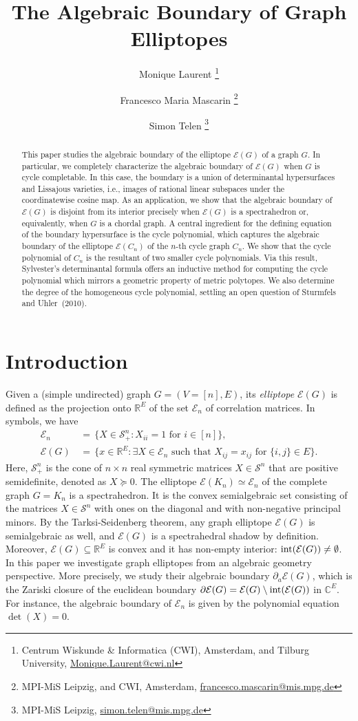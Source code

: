 \documentclass[a4paper, 11pt, twoside]{article}
\title{\bf The Algebraic Boundary of Graph Elliptopes}
\author{Monique Laurent \thanks{Centrum Wiskunde \& Informatica (CWI), Amsterdam, and Tilburg University, \url{Monique.Laurent@cwi.nl}}
\and Francesco Maria Mascarin \thanks{MPI-MiS Leipzig, and CWI, Amsterdam,
\url{francesco.mascarin@mis.mpg.de}}
\and  Simon Telen \thanks{MPI-MiS Leipzig,
\url{simon.telen@mis.mpg.de}}
}
\date{}
\newcommand{\R}{\mathbb{R}}
\newcommand{\ME}{{\mathcal E}}
\newcommand{\MS}{{\mathcal S}}
\theoremstyle{plain}
\begin{document}
 \maketitle

\begin{abstract}
\noindent This paper studies the algebraic boundary of the elliptope $\ME(G)$ of a graph $G$. In particular, we completely characterize the algebraic boundary of $\ME(G)$ when $G$ is cycle completable. In this case, the boundary is a union of determinantal hypersurfaces and Lissajous varieties, i.e., images of rational linear subspaces under the coordinatewise cosine map. 
As an application, we show that the algebraic boundary of  $\ME(G)$ is disjoint from its interior precisely when $\ME(G)$ is a spectrahedron or, equivalently, when $G$ is a chordal graph.
A central ingredient for the defining equation of the boundary hypersurface is the cycle polynomial, which captures the algebraic boundary of the elliptope $\ME(C_n)$ of the 
 $n$-th cycle graph $C_n$. We show that the cycle polynomial of $C_n$ is the resultant of two smaller cycle polynomials. Via this result, Sylvester's determinantal formula offers an inductive method for computing the cycle polynomial which mirrors a geometric property of metric polytopes.
 We also determine the degree of the homogeneous cycle polynomial, settling an open question of Sturmfels and Uhler~(2010). 
\end{abstract}

\section{Introduction}\label{sec:introduction}

Given a (simple undirected) graph $G=(V=[n],E)$, its  {\em elliptope} $\ME(G)$ is defined as the projection onto $\R^E$ of the set $\ME_n$ of correlation matrices. In symbols, we have
\begin{align*}
\ME_n & \, = \, \{X\in \MS^n_+:     X_{ii}=1 \text{ for } i\in [n]\},\\
 \ME(G) & \,  = \,  \{x\in \R^E: \exists X \in \ME_n \text{ such that } X_{ij}=x_{ij} \text{ for } \{i,j\}\in E\}.
\end{align*}
Here, $\MS^n_+$ is the cone of $n\times n$ real symmetric matrices $X\in\MS^n$ that are  positive semidefinite, denoted as $X\succeq 0$. The elliptope $\ME(K_n)\simeq \ME_n$ of the  complete graph $G=K_n$ is a spectrahedron. It is the convex semialgebraic set consisting of the matrices $X \in \MS^n$ with ones on the diagonal and with non-negative principal minors. By the Tarksi-Seidenberg theorem, any graph elliptope $\ME(G)$ is semialgebraic as well, and $\ME(G)$ is a spectrahedral shadow by definition. Moreover, $\ME(G) \subseteq \R^E$ is convex and it has non-empty interior: ${\rm int}(\ME(G)) \neq \emptyset$. In this paper we investigate graph elliptopes from an algebraic geometry perspective. More precisely, we study their algebraic boundary $\partial_a\ME(G)$, which is the Zariski closure of the euclidean boundary $\partial\ME(G) = \ME(G) \setminus {\rm int}(\ME(G))$ in $\mathbb{C}^E$. For instance, the algebraic boundary of $\ME_n$ is given by the polynomial equation $\det(X)=0$. 
\end{document}
